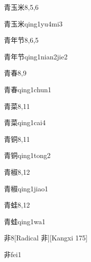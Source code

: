 \begin{entry}{青玉米}{8,5,6}
  \begin{phonetics}{青玉米}{qing1yu4mi3}
  \end{phonetics}
\end{entry}

\begin{entry}{青年节}{8,6,5}
  \begin{phonetics}{青年节}{qing1nian2jie2}
  \end{phonetics}
\end{entry}

\begin{entry}{青春}{8,9}
  \begin{phonetics}{青春}{qing1chun1}
  \end{phonetics}
\end{entry}

\begin{entry}{青菜}{8,11}
  \begin{phonetics}{青菜}{qing1cai4}
  \end{phonetics}
\end{entry}

\begin{entry}{青铜}{8,11}
  \begin{phonetics}{青铜}{qing1tong2}
  \end{phonetics}
\end{entry}

\begin{entry}{青椒}{8,12}
  \begin{phonetics}{青椒}{qing1jiao1}
  \end{phonetics}
\end{entry}

\begin{entry}{青蛙}{8,12}
  \begin{phonetics}{青蛙}{qing1wa1}
  \end{phonetics}
\end{entry}

\begin{entry}{非}{8}[Radical ⾮][Kangxi 175]
  \begin{phonetics}{非}{fei1}
  \end{phonetics}
\end{entry}


